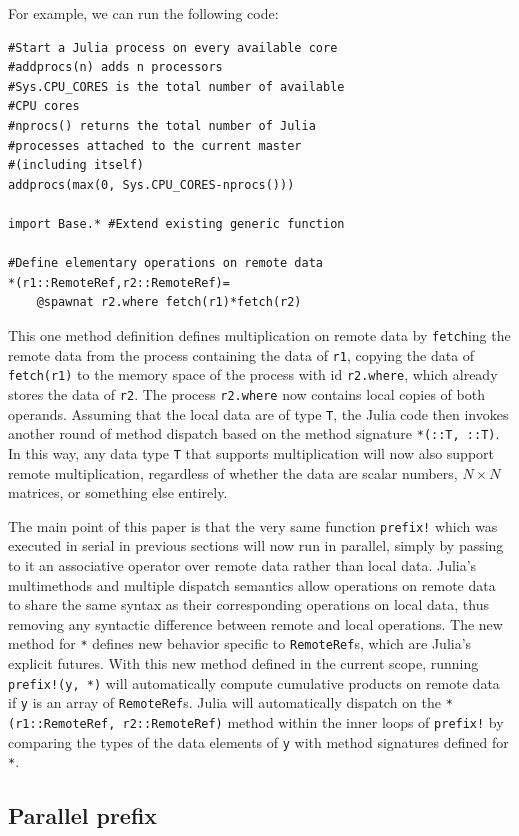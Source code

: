 \documentclass{sig-alternate}
\newcommand{\code}[1]{\texttt{#1}}
\begin{document}
For example, we can run the following code:

\begin{verbatim}
#Start a Julia process on every available core
#addprocs(n) adds n processors
#Sys.CPU_CORES is the total number of available
#CPU cores
#nprocs() returns the total number of Julia
#processes attached to the current master
#(including itself)
addprocs(max(0, Sys.CPU_CORES-nprocs()))

import Base.* #Extend existing generic function

#Define elementary operations on remote data
*(r1::RemoteRef,r2::RemoteRef)=
    @spawnat r2.where fetch(r1)*fetch(r2)
\end{verbatim}
%
This one method definition defines multiplication on remote data by
\code{fetch}ing the remote data from the process containing the data of
\code{r1}, copying the data of \code{fetch(r1)} to the memory space of the
process with id \code{r2.where}, which already stores the data of \code{r2}.
The process \code{r2.where} now contains local copies of both operands.
Assuming that the local data are of type \code{T}, the Julia code
then invokes another round of method dispatch based on the method signature
\code{*(::T, ::T)}. In this way, any data type \code{T} that supports
multiplication will now also support remote multiplication, regardless of
whether the data are scalar numbers, $N\times N$ matrices, or something else
entirely.

The main point of this paper is that the very same function \code{prefix!}
which was executed in serial in previous sections will now run in parallel,
simply by passing to it an associative operator over remote data rather than
local data. Julia's multimethods and multiple dispatch semantics allow
operations on remote data to share the same syntax as their corresponding
operations on local data, thus removing any syntactic difference between remote
and local operations. The new method for \code{*} defines new behavior
specific to \code{RemoteRef}s, which are Julia's explicit futures. With this
new method defined in the current scope, running \code{prefix!(y, *)} will
automatically compute cumulative products on remote data if \code{y} is an
array of \code{RemoteRef}s. Julia will automatically dispatch on the
\code{*(r1::RemoteRef, r2::RemoteRef)} method within the inner loops of
\code{prefix!} by comparing the types of the data elements of \code{y} with
method signatures defined for \code{*}.

\subsection{Parallel prefix}
\label{sec:parallel-prefix}
\end{document}
